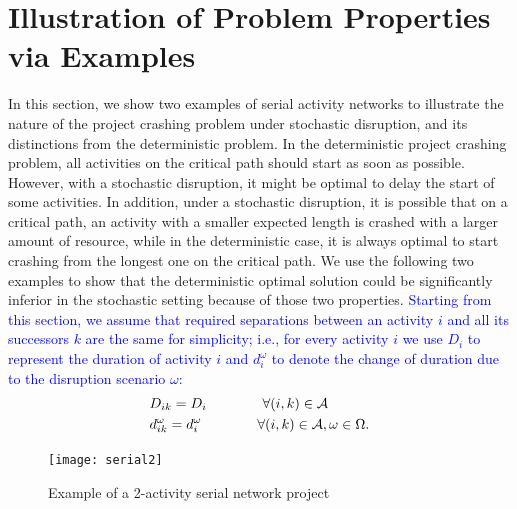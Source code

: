 \documentclass[11pt]{article}
\newcommand{\cA}{{\cal A}}
\newcommand{\tcb}{\textcolor{blue}}
\begin{document}
\section{Illustration of Problem Properties via Examples} \label{sec:examples}
	In this section, we show two examples of serial activity networks to illustrate the nature of the project crashing problem under stochastic disruption, and its distinctions from the deterministic problem. In the deterministic project crashing problem, all activities on the critical path should start as soon as possible. However, with a stochastic disruption, it might be optimal to delay the start of some activities. In addition, under a stochastic disruption, it is possible that on a critical path, an activity with a smaller expected length is crashed with a larger amount of resource, while in the deterministic case, it is always optimal to start crashing from the longest one on the critical path. We use the following two examples to show that the deterministic optimal solution could be significantly inferior in the stochastic setting because of those two properties. \tcb{Starting from this section, we assume that required separations between an activity \(i\) and all its successors \(k\) are the same for simplicity; i.e., for every activity \(i\) we use \(D_i\) to represent the duration of activity \(i\) and \(d_i^\omega\) to denote the change of duration due to the disruption scenario \(\omega\):
	\begin{align*}
		& D_{ik} = D_i \qquad \qquad \forall (i,k) \in \cA\\
		& d^{\omega}_{ik} = d^{\omega}_i \qquad \qquad \forall (i,k) \in \cA, \omega \in \Omega.
	\end{align*}}
	\begin{figure}[H]
		\centering
		\texttt{[image: serial2]}
		\caption{Example of a 2-activity serial network project}
		\label{fig:serial2}
	\end{figure}
\end{document}
